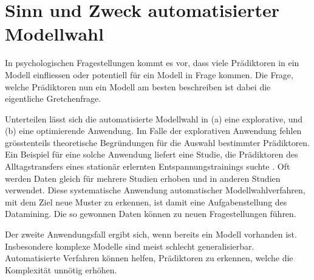 \section{Sinn und Zweck automatisierter Modellwahl}
In psychologischen Fragestellungen kommt es vor, dass viele Prädiktoren in ein Modell einfliessen oder potentiell für ein Modell in Frage kommen.
Die Frage, welche Prädiktoren nun ein Modell am besten beschreiben ist dabei die eigentliche Gretchenfrage. 

Unterteilen lässt sich die automatisierte Modellwahl in (a) eine explorative, und (b) eine optimierende Anwendung. 
Im Falle der explorativen Anwendung fehlen grösstenteils theoretische Begründungen für die Auswahl bestimmter Prädiktoren. Ein Beispiel für eine solche Anwendung liefert eine Studie, die Prädiktoren des Alltagstransfers eines stationär erlernten Entspannungstrainings suchte \cite{023755520080101}.
Oft werden Daten gleich für mehrere Studien erhoben und in anderen Studien verwendet.
Diese systematische Anwendung automatischer Modellwahlverfahren, mit dem Ziel neue Muster zu erkennen, ist damit eine Aufgabenstellung des Datamining. 
Die so gewonnen Daten können zu neuen Fragestellungen führen. 

Der zweite Anwendungsfall ergibt sich, wenn bereits ein Modell vorhanden ist. Insbesondere komplexe Modelle sind meist schlecht generalisierbar. Automatisierte Verfahren können  helfen, Prädiktoren zu erkennen, welche die Komplexität unnötig erhöhen.